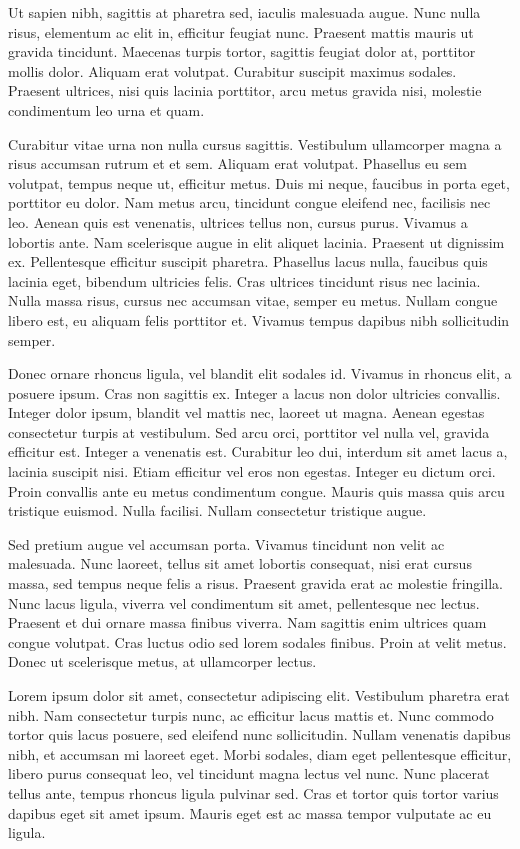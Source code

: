 \documentclass[a4paper]{memoir}
\begin{document}
Ut sapien nibh, sagittis at pharetra sed, iaculis malesuada augue. Nunc nulla risus, elementum ac elit in, efficitur feugiat nunc. Praesent mattis mauris ut gravida tincidunt. Maecenas turpis tortor, sagittis feugiat dolor at, porttitor mollis dolor. Aliquam erat volutpat. Curabitur suscipit maximus sodales. Praesent ultrices, nisi quis lacinia porttitor, arcu metus gravida nisi, molestie condimentum leo urna et quam. 

Curabitur vitae urna non nulla cursus sagittis. Vestibulum ullamcorper magna a risus accumsan rutrum et et sem. Aliquam erat volutpat. Phasellus eu sem volutpat, tempus neque ut, efficitur metus. Duis mi neque, faucibus in porta eget, porttitor eu dolor. Nam metus arcu, tincidunt congue eleifend nec, facilisis nec leo. Aenean quis est venenatis, ultrices tellus non, cursus purus. Vivamus a lobortis ante. Nam scelerisque augue in elit aliquet lacinia. Praesent ut dignissim ex. Pellentesque efficitur suscipit pharetra. Phasellus lacus nulla, faucibus quis lacinia eget, bibendum ultricies felis. Cras ultrices tincidunt risus nec lacinia. Nulla massa risus, cursus nec accumsan vitae, semper eu metus. Nullam congue libero est, eu aliquam felis porttitor et. Vivamus tempus dapibus nibh sollicitudin semper. 

Donec ornare rhoncus ligula, vel blandit elit sodales id. Vivamus in rhoncus elit, a posuere ipsum. Cras non sagittis ex. Integer a lacus non dolor ultricies convallis. Integer dolor ipsum, blandit vel mattis nec, laoreet ut magna. Aenean egestas consectetur turpis at vestibulum. Sed arcu orci, porttitor vel nulla vel, gravida efficitur est. Integer a venenatis est. Curabitur leo dui, interdum sit amet lacus a, lacinia suscipit nisi. Etiam efficitur vel eros non egestas. Integer eu dictum orci. Proin convallis ante eu metus condimentum congue. Mauris quis massa quis arcu tristique euismod. Nulla facilisi. Nullam consectetur tristique augue. 

Sed pretium augue vel accumsan porta. Vivamus tincidunt non velit ac malesuada. Nunc laoreet, tellus sit amet lobortis consequat, nisi erat cursus massa, sed tempus neque felis a risus. Praesent gravida erat ac molestie fringilla. Nunc lacus ligula, viverra vel condimentum sit amet, pellentesque nec lectus. Praesent et dui ornare massa finibus viverra. Nam sagittis enim ultrices quam congue volutpat. Cras luctus odio sed lorem sodales finibus. Proin at velit metus. Donec ut scelerisque metus, at ullamcorper lectus. 

Lorem ipsum dolor sit amet, consectetur adipiscing elit. Vestibulum pharetra erat nibh. Nam consectetur turpis nunc, ac efficitur lacus mattis et. Nunc commodo tortor quis lacus posuere, sed eleifend nunc sollicitudin. Nullam venenatis dapibus nibh, et accumsan mi laoreet eget. Morbi sodales, diam eget pellentesque efficitur, libero purus consequat leo, vel tincidunt magna lectus vel nunc. Nunc placerat tellus ante, tempus rhoncus ligula pulvinar sed. Cras et tortor quis tortor varius dapibus eget sit amet ipsum. Mauris eget est ac massa tempor vulputate ac eu ligula. 
\end{document}
